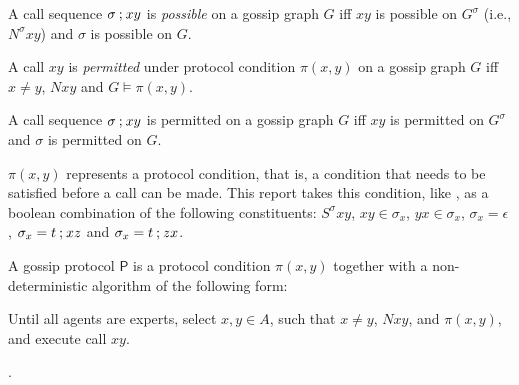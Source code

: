 \begin{definition}[Calls]
    \begin{subdefinition}
        \label{def:call-sequence-possibility}
        A call sequence \(\sigma \mathbin{;} xy\) is \emph{possible} on a gossip graph \(G\) iff \(xy\) is possible on \(G^\sigma\) (i.e., \(N^\sigma xy\)) and \(\sigma\) is possible on \(G\).
    \end{subdefinition}

    \begin{subdefinition}
        \label{def:call-permissibility}
        A call \(xy\) is \emph{permitted} under protocol condition \(\pi(x,y)\) on a gossip graph \(G\) iff \(x \neq y\), \(N xy\) and \(G \models \pi(x,y)\).
    \end{subdefinition}

    \begin{subdefinition}
        \label{def:call-sequence-permissibility}
        A call sequence \(\sigma \mathbin{;} xy\) is permitted on a gossip graph \(G\) iff \(xy\) is permitted on \(G^\sigma\) and \(\sigma\) is permitted on \(G\).
    \end{subdefinition}
\end{definition}

\begin{definition}
    \label{def:gossip-protocols}
    \begin{subdefinition}
        \label{def:protocol-condition}
        \(\pi(x,y)\) represents a protocol condition, that is, a condition that needs to be satisfied before a call can be made.
        This report takes this condition, like \Textcite{van_ditmarsch_dynamic_2018}, as a boolean combination of the following constituents: \(S^\sigma xy\), \(xy \in \sigma_x\), \(yx \in \sigma_x\), \(\sigma_x = \epsilon\), \(\sigma_x = t \mathbin{;} xz\) and \(\sigma_x = t \mathbin{;} zx\).
    \end{subdefinition}
    
    \begin{subdefinition}
        \label{def:gossip-protocol}
        A gossip protocol \(\mathsf{P}\) is a protocol condition \(\pi(x,y)\) together with a non-deterministic algorithm of the following form:
        
        \begin{displayquote}
            Until all agents are experts, select \( x, y \in A \), such that \( x \neq y \), \(Nxy\), and \( \pi(x, y) \), and execute call \(xy\).
            
        \parencite[Def. 5]{van_ditmarsch_dynamic_2018}.
        \end{displayquote}
        
    \end{subdefinition}
\end{definition}


